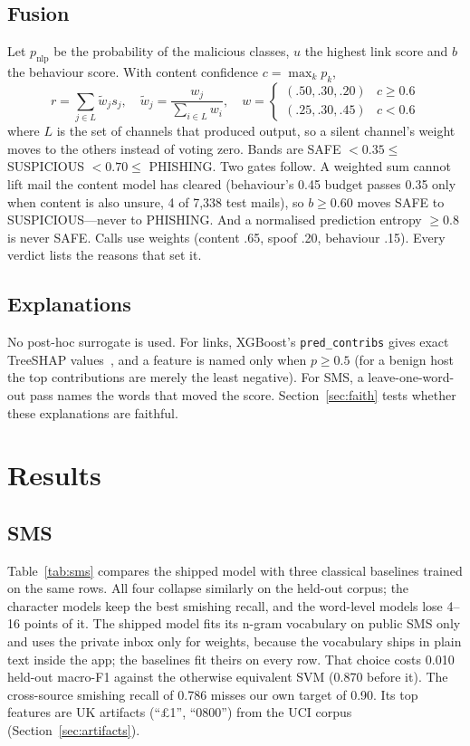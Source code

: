 \documentclass[conference]{IEEEtran}
\begin{document}
\subsection{Fusion}
Let $p_{\text{nlp}}$ be the probability of the malicious classes, $u$ the
highest link score and $b$ the behaviour score. With content confidence
$c=\max_k p_k$,
\begin{equation}
r=\sum_{j\in L} \tilde w_j s_j,\quad \tilde w_j=\frac{w_j}{\sum_{i\in L}w_i},\quad
w=\begin{cases}(.50,.30,.20) & c\ge 0.6\\(.25,.30,.45) & c<0.6\end{cases}
\end{equation}
where $L$ is the set of channels that produced output, so a silent channel's
weight moves to the others instead of voting zero. Bands are SAFE $<0.35\le$
SUSPICIOUS $<0.70\le$ PHISHING. Two gates follow. A weighted sum cannot lift
mail the content model has cleared (behaviour's 0.45 budget passes 0.35 only when
content is also unsure, 4 of 7,338 test mails), so $b\ge0.60$ moves SAFE to
SUSPICIOUS---never to PHISHING. And a normalised prediction entropy $\ge 0.8$
is never SAFE. Calls use weights (content .65, spoof .20, behaviour .15). Every
verdict lists the reasons that set it.

\subsection{Explanations}
No post-hoc surrogate is used. For links, XGBoost's \texttt{pred\_contribs}
gives exact TreeSHAP values~\cite{lundberg2020trees}, and a feature is named only
when $p\ge0.5$ (for a benign host the top contributions are merely the least
negative). For SMS, a leave-one-word-out pass names the words that moved the
score. Section~\ref{sec:faith} tests whether these explanations are faithful.

\section{Results}\label{sec:results}

\subsection{SMS}
Table~\ref{tab:sms} compares the shipped model with three classical baselines
trained on the same rows. All four collapse similarly on the held-out corpus;
the character models keep the best smishing recall, and the word-level models
lose 4--16 points of it. The shipped model fits its n-gram vocabulary on public
SMS only and uses the private inbox only for weights, because the vocabulary
ships in plain text inside the app; the baselines fit theirs on every row. That
choice costs 0.010 held-out macro-F1 against the otherwise equivalent SVM
(0.870 before it). The cross-source smishing recall of 0.786 misses our
own target of 0.90. Its top features are UK artifacts (``\pounds1'', ``0800'') from
the UCI corpus (Section~\ref{sec:artifacts}).
\end{document}
